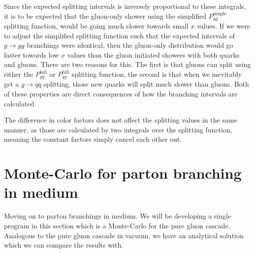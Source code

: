 \documentclass[main.tex]{subfiles}
\begin{document}
Since the expected splitting intervals is inversely proportional to these integrals, it is to be expected that the gluon-only shower using the simplified \(P_{gg}^{\text{simple}}\) splitting function, would be going much slower towards small \(x\) values. If we were to adjust the simplified splitting function such that the expected intervals of \(g\rightarrow gg\) branchings were identical, then the gluon-only distribution would go faster towards low \(x\) values than the gluon initiated showers with both quarks and gluons. There are two reasons for this. The first is that gluons can split using either the \(P_{gg}^{\text{full}}\) or \(P_{qg}^{\text{full}}\) splitting function, the second is that when we inevitably get a \(g\rightarrow q\bar q\) splitting, those new quarks will split much slower than gluons. Both of these properties are direct consequences of how the branching intervals are calculated. 

The difference in color factors does not affect the splitting values in the same manner, as those are calculated by two integrals over the splitting function, meaning the constant factors simply cancel each other out.

\newpage
\section{Monte-Carlo for parton branching in medium}
Moving on to parton branchings in medium. We will be developing a single program in this section which is a Monte-Carlo for the pure gluon cascade. Analogous to the pure gluon cascade in vacuum, we have an analytical solution which we can compare the results with. 
\end{document}
